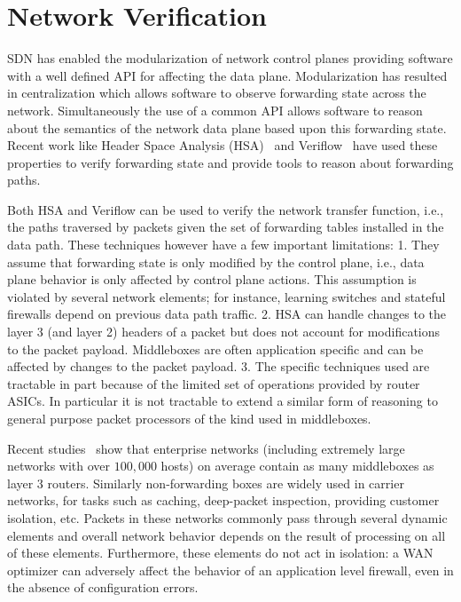 \documentclass[letterpaper]{article}
\begin{document}
\section*{Network Verification}
SDN has enabled the modularization of network control planes providing software with a well defined API for
affecting the data plane. Modularization has resulted in centralization which allows software to observe
forwarding state across the network. Simultaneously the use of a common API allows software to reason about
the semantics of the network data plane based upon this forwarding state. Recent work like Header Space
Analysis (HSA)~\cite{kazemian2012header} and Veriflow~\cite{khurshid13veriflow} have used these properties to
verify forwarding state and provide tools to reason about forwarding paths. 

Both HSA and Veriflow can be used to verify the network transfer function, i.e., the paths traversed by
packets given the set of forwarding tables installed in the data path. These techniques however have a few
important limitations: 1. They assume that forwarding state is only modified by the control plane, i.e.,
data plane behavior is only affected by control plane actions. This assumption is violated by several network
elements; for instance, learning switches and stateful firewalls depend on previous data path traffic. 2.
HSA can handle changes to the layer 3 (and layer 2) headers of a packet but does not account for modifications to the
packet payload. Middleboxes are often application specific and can be affected by changes to the packet
payload. 3. The specific techniques used are tractable in part because of the limited set of operations provided by
router ASICs. In particular it is not tractable to extend a similar form of reasoning to general purpose
packet processors of the kind used in middleboxes.

Recent studies~\cite{sherry2012making} show that enterprise networks (including extremely large networks with
over $100,000$ hosts) on average contain as many middleboxes as layer 3 routers. Similarly non-forwarding
boxes are widely used in carrier networks, for tasks such as caching, deep-packet inspection, providing
customer isolation, etc. Packets in these networks commonly pass through several dynamic elements and overall
network behavior depends on the result of processing on all of these elements. Furthermore, these elements do
not act in isolation: a WAN optimizer can adversely affect the behavior of an application level firewall, even
in the absence of configuration errors.
\end{document}
